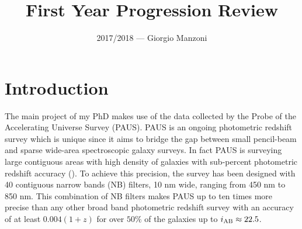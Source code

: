 \documentclass[letterpaper]{article}
\newcommand{\peg}{P$\&$G }
\begin{document}
\title{First Year Progression Review} %
\date{ }
\author{2017/2018 --- Giorgio Manzoni}
\maketitle
\abstract{In this document I report all the work done in my first year of the CDT PhD programme, and the work that I plan to do in the next upcoming years, under the supervision of Peder Norberg and Carlton Baugh. %
}
\tableofcontents

\section{Introduction}
\label{sec:intro}

The main project of my PhD makes use of the data collected by the Probe of the Accelerating Universe Survey (PAUS). PAUS is an ongoing photometric redshift survey which is unique since it aims to bridge the gap between small pencil-beam and sparse wide-area spectroscopic galaxy surveys. In fact PAUS is surveying large contiguous areas with high density of galaxies with sub-percent photometric redshift accuracy (\cite{eriksen18}). To achieve this precision, the survey has been designed with 40 contiguous narrow bands (NB) filters, 10 nm wide, ranging from 450 nm to 850 nm. This combination of NB filters makes PAUS up to ten times more precise than any other broad band photometric redshift survey with an accuracy of at least $0.004 (1+z)$ for over $50 \%$ of the galaxies up to $i_{\rm{AB}}\approx 22.5$. 
\end{document}
